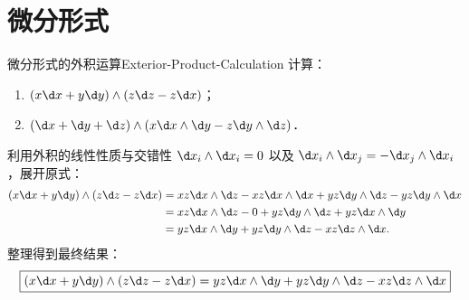 \section{微分形式}

\begin{problem}{微分形式的外积运算}{Exterior-Product-Calculation}
    计算：
    \begin{enumerate}
        \item $(x \d x + y \d y) \wedge (z \d z - z \d x)$；
        \item $(\d x + \d y + \d z) \wedge (x \d x \wedge \d y - z \d y \wedge \d z)$．
    \end{enumerate}
\end{problem}

\begin{solution}

    利用外积的线性性质与交错性 $\d x_i \wedge \d x_i = 0$ 以及 $\d x_i \wedge \d x_j = -\d x_j \wedge \d x_i$，展开原式：
    \begin{equation}
        \begin{aligned}
            (x \d x + y \d y) \wedge (z \d z - z \d x) & = x z \d x \wedge \d z - x z \d x \wedge \d x + y z \d y \wedge \d z - y z \d y \wedge \d x \\
                                                       & = x z \d x \wedge \d z - 0 + y z \d y \wedge \d z + y z \d x \wedge \d y                    \\
                                                       & = y z \d x \wedge \d y + y z \d y \wedge \d z - x z \d z \wedge \d x.
        \end{aligned}
        \label{eq:ext-prod-1}
    \end{equation}
    整理得到最终结果：
    \begin{equation}
        \boxed{(x \d x + y \d y) \wedge (z \d z - z \d x) = y z \d x \wedge \d y + y z \d y \wedge \d z - x z \d z \wedge \d x}
    \end{equation}



\end{solution}
